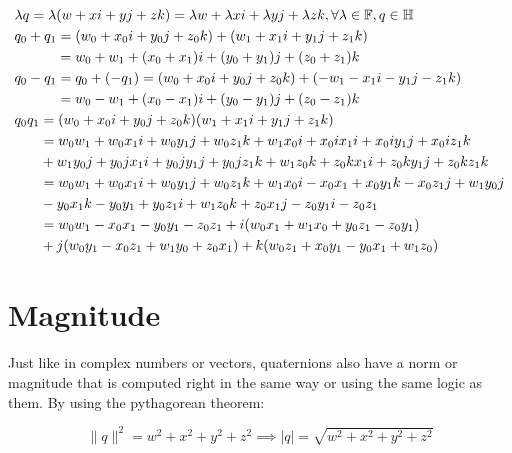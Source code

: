 \documentclass[12pt]{article}
\begin{document}
	\[
		\begin{aligned}
			& \lambda q
			= \lambda (w + xi + yj + zk) = \lambda w + \lambda xi + \lambda yj + \lambda zk,
			\forall \lambda \in \mathbb{F}, q \in \mathbb{H}
			\\
			& q_0 + q_1
			= (w_0 + x_0i + y_0j + z_0k) + (w_1 + x_1i + y_1j + z_1k)
			\\
			& \hspace{3em} = w_0 + w_1 + (x_0 + x_1)i + (y_0 + y_1)j + (z_0 + z_1)k
			\\
			& q_0 - q_1
			= q_0 + (-q_1)
			= (w_0 + x_0i + y_0j + z_0k) + (-w_1 - x_1i - y_1j - z_1k)
			\\
			& \hspace{3em} = w_0 - w_1 + (x_0 - x_1)i + (y_0 - y_1)j + (z_0 - z_1)k
			\\
			& q_0q_1 = (w_0 + x_0i + y_0j + z_0k)(w_1 + x_1i + y_1j + z_1k)
			\\ & \hspace{1.8em} = w_0w_1 + w_0x_1i + w_0y_1j + w_0z_1k + w_1x_0i + x_0ix_1i + x_0iy_1j + x_0iz_1k
			\\ & \hspace{1.8em} + w_1y_0j + y_0jx_1i + y_0jy_1j + y_0jz_1k + w_1z_0k + z_0kx_1i + z_0ky_1j + z_0kz_1k
			\\ & \hspace{1.8em} = w_0w_1 + w_0x_1i + w_0y_1j + w_0z_1k + w_1x_0i - x_0x_1 + x_0y_1k - x_0z_1j + w_1y_0j
			\\ & \hspace{1.8em} - y_0x_1k - y_0y_1 + y_0z_1i + w_1z_0k + z_0x_1j - z_0y_1i - z_0z_1
			\\ & \hspace{1.8em} = w_0w_1 - x_0x_1 - y_0y_1 - z_0z_1 + i(w_0x_1 + w_1x_0 + y_0z_1 - z_0y_1)
			\\ & \hspace{1.8em} + j(w_0y_1 - x_0z_1 + w_1y_0 + z_0x_1) + k(w_0z_1 + x_0y_1 - y_0x_1 + w_1z_0)
		\end{aligned}
	\]
	
	\section{Magnitude}
	
	Just like in complex numbers or vectors, quaternions also have a norm or magnitude that is computed right in the same way or using the same logic as them. By using the pythagorean theorem:
	
	\[
		\|q\|^2 = w^2 + x^2 + y^2 + z^2 \implies |q| = \sqrt{w^2 + x^2 + y^2 + z^2}
	\]
	
\end{document}
